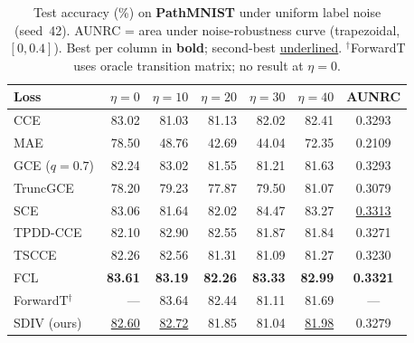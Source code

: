 
\begin{table}[t]
\centering
\caption{Test accuracy (\%) on \textbf{PathMNIST} under uniform label noise
(seed~42). AUNRC = area under noise-robustness curve (trapezoidal, $[0,0.4]$).
Best per column in \textbf{bold}; second-best \underline{underlined}.
$^\dagger$ForwardT uses oracle transition matrix; no result at $\eta{=}0$.}
\label{tab:noise_medical}
\small
\setlength{\tabcolsep}{5pt}
\begin{tabular}{@{}lrrrrrc@{}}
\toprule
\textbf{Loss} & $\eta{=}0$ & $\eta{=}10$ & $\eta{=}20$ & $\eta{=}30$ & $\eta{=}40$ & \textbf{AUNRC} \\
\midrule
CCE              & 83.02 & 81.03 & 81.13 & 82.02 & 82.41 & 0.3293 \\
MAE              & 78.50 & 48.76 & 42.69 & 44.04 & 72.35 & 0.2109 \\
GCE ($q{=}0.7$)  & 82.24 & 83.02 & 81.55 & 81.21 & 81.63 & 0.3293 \\
TruncGCE         & 78.20 & 79.23 & 77.87 & 79.50 & 81.07 & 0.3079 \\
SCE              & 83.06 & 81.64 & 82.02 & 84.47 & 83.27 & \underline{0.3313} \\
TPDD-CCE         & 82.10 & 82.90 & 82.55 & 81.87 & 81.84 & 0.3271 \\
TSCCE            & 82.26 & 82.56 & 81.31 & 81.09 & 81.27 & 0.3230 \\
FCL              & \textbf{83.61} & \textbf{83.19} & \textbf{82.26} & \textbf{83.33} & \textbf{82.99} & \textbf{0.3321} \\
ForwardT$^\dagger$ & --- & 83.64 & 82.44 & 81.11 & 81.69 & --- \\
SDIV (ours)      & \underline{82.60} & \underline{82.72} & 81.85 & 81.04 & \underline{81.98} & 0.3279 \\
\bottomrule
\end{tabular}
\end{table}
